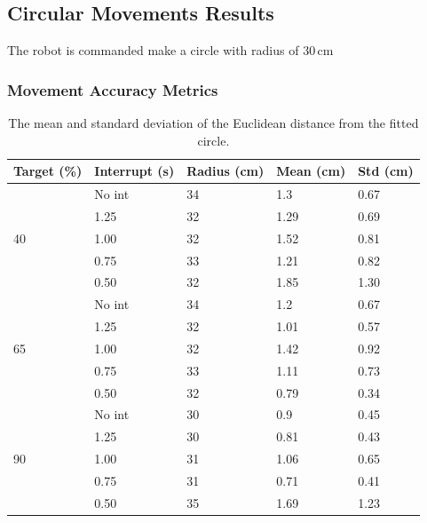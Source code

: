 \subsection{Circular Movements Results}

The robot is commanded make a circle with radius of 30\,cm
\subsubsection{Movement Accuracy Metrics}



\begin{table}[t]
	\centering
	\caption{The mean and standard deviation of the Euclidean distance from the fitted circle.}
	\label{tab:circular_results}
	\begin{tabular}{|l|l||l|l|l|}
		\hline
		Target (\%) & Interrupt (s) & Radius (cm) & Mean (cm) & Std (cm)\\
		\hline \hline
		\multirow{5}{*}{40} & No int & 34 & 1.3 & 0.67 \\
		& 1.25 & 32 & 1.29 & 0.69 \\
		& 1.00 & 32 & 1.52 & 0.81 \\
		& 0.75 & 33 & 1.21 & 0.82 \\
		& 0.50 & 32 & 1.85 & 1.30 \\
		\hline
		\multirow{5}{*}{65} & No int & 34 & 1.2 & 0.67 \\
		& 1.25 & 32 & 1.01 & 0.57 \\
		& 1.00 & 32 & 1.42 & 0.92 \\
		& 0.75 & 33 & 1.11 & 0.73 \\
		& 0.50 & 32 & 0.79 & 0.34 \\
		\hline
		\multirow{5}{*}{90} & No int & 30 & 0.9 & 0.45 \\
		& 1.25 & 30 & 0.81 & 0.43 \\
		& 1.00 & 31 & 1.06 & 0.65 \\
		& 0.75 & 31 & 0.71 & 0.41 \\
		& 0.50 & 35 & 1.69 & 1.23 \\
		\hline
	\end{tabular}
\end{table}


